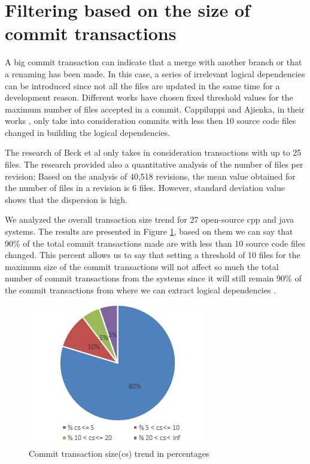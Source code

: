\documentclass[12pt]{mitthesis}
\begin{document}
\section{Filtering based on the size of commit transactions}

A big commit transaction can indicate that a merge with another branch or that a renaming has been made.
In this case, a series of irrelevant logical dependencies can be introduced since not all the files are updated in the same time for a development reason. Different works have chosen fixed threshold values for the maximum number of files accepted in a commit. Cappiluppi and Ajienka, in their works \cite{DBLP:journals/jss/AjienkaC17}, \cite{DBLP:journals/ese/AjienkaCC18} only take into consideration commits with less then 10 source code files changed in building the logical dependencies.

The research of Beck et al \cite{Beck:2011:CMC:2025113.2025162} only takes in consideration transactions with up to 25 files. The research \cite{Oliva:2011:ISL:2067853.2068086} provided also a quantitative analysis of the number of files per revision; Based on the analysis of 40,518 revisions, the mean value obtained for the number of files in a revision is 6 files. However, standard deviation value shows that the dispersion is high. 

We analyzed the overall transaction size trend for 27 open-source cpp and java systems. The results are presented in Figure \ref{fig:fig_cs}, based on them we can say that 90\% of the total commit transactions made are with less than 10 source code files changed. This percent allows us to say that setting a threshold of 10 files for the maximum size of the commit transactions will not affect so much the total number of commit transactions from the systems since it will still remain 90\% of the commit transactions from where we can extract logical dependencies \cite{DepSACI}.


\begin{figure}[h]
\centering
\includegraphics{fig_cs.png}
\caption{Commit transaction size(cs) trend in percentages}
\label{fig:fig_cs}
\centering
\end{figure}
\end{document}
